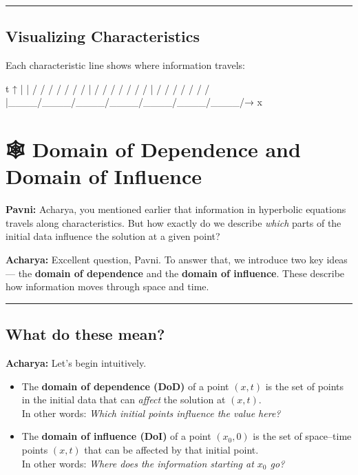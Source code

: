 \documentclass[
  letterpaper,
]{book}
\newenvironment{Shaded}{\begin{snugshade}}{\end{snugshade}}
\newcommand{\NormalTok}[1]{\textcolor[rgb]{0.00,0.23,0.31}{#1}}
\begin{document}
\begin{center}\rule{0.5\linewidth}{0.5pt}\end{center}

\subsection{Visualizing
Characteristics}\label{visualizing-characteristics}

Each characteristic line shows where information travels:

\begin{Shaded}
\begin{Highlighting}[]
\NormalTok{t ↑}
\NormalTok{  |}
\NormalTok{  |       /    /    /    /    /    /    /}
\NormalTok{  |      /    /    /    /    /    /    /}
\NormalTok{  |     /    /    /    /    /    /    /}
\NormalTok{  |\_\_\_\_/\_\_\_\_/\_\_\_\_/\_\_\_\_/\_\_\_\_/\_\_\_\_/\_\_\_\_/→ x}
\end{Highlighting}
\end{Shaded}

\section{🕸️ Domain of Dependence and Domain of
Influence}\label{domain-of-dependence-and-domain-of-influence}

\textbf{Pavni:} Acharya, you mentioned earlier that information in
hyperbolic equations travels along characteristics. But how exactly do
we describe \emph{which} parts of the initial data influence the
solution at a given point?

\textbf{Acharya:} Excellent question, Pavni. To answer that, we
introduce two key ideas --- the \textbf{domain of dependence} and the
\textbf{domain of influence}. These describe how information moves
through space and time.

\begin{center}\rule{0.5\linewidth}{0.5pt}\end{center}

\subsection{What do these mean?}\label{what-do-these-mean}

\textbf{Acharya:} Let's begin intuitively.

\begin{itemize}
\item
  The \textbf{domain of dependence (DoD)} of a point \((x,t)\) is the
  set of points in the initial data that can \emph{affect} the solution
  at \((x,t)\).\\
  In other words: \emph{Which initial points influence the value here?}
\item
  The \textbf{domain of influence (DoI)} of a point \((x_0,0)\) is the
  set of space--time points \((x,t)\) that can be affected by that
  initial point.\\
  In other words: \emph{Where does the information starting at \(x_0\)
  go?}
\end{itemize}
\end{document}

